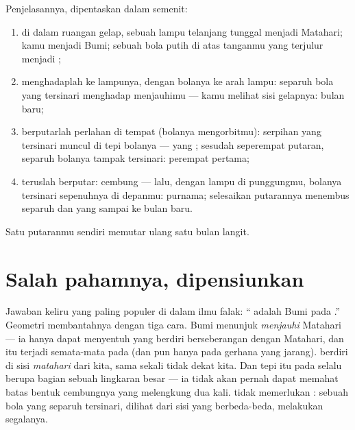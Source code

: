 \begin{method}\label{met:g7:moon-phases:walk}
Penjelasannya, dipentaskan dalam semenit:
\begin{enumerate}
  \item di dalam ruangan gelap, sebuah lampu telanjang tunggal
        menjadi Matahari; kamu menjadi Bumi; sebuah bola putih di
        atas tanganmu yang terjulur menjadi ;
  \item menghadaplah ke lampunya, dengan bolanya ke arah lampu:
        separuh bola yang tersinari menghadap menjauhimu --- kamu
        melihat sisi gelapnya: bulan baru;
  \item berputarlah perlahan di tempat (bolanya mengorbitmu):
        serpihan yang tersinari muncul di tepi bolanya ---  yang
        ; sesudah seperempat putaran, separuh bolanya tampak
        tersinari: perempat pertama;
  \item teruslah berputar: cembung --- lalu, dengan lampu di
        punggungmu, bolanya tersinari sepenuhnya di depanmu: purnama;
        selesaikan putarannya menembus separuh dan  yang
         sampai ke bulan baru.
\end{enumerate}
Satu putaranmu sendiri memutar ulang satu bulan langit.
\end{method}

\section{Salah pahamnya, dipensiunkan}

\begin{proposition}\label{prop:g7:moon-phases:notshadow}
Jawaban keliru yang paling populer di dalam ilmu falak: ``
adalah  Bumi pada .'' Geometri membantahnya dengan
tiga cara.  Bumi menunjuk \emph{menjauhi} Matahari ---
ia hanya dapat menyentuh  yang berdiri berseberangan dengan
Matahari, dan itu terjadi semata-mata pada  (dan pun
hanya pada gerhana yang jarang).   berdiri di sisi
\emph{matahari} dari kita, sama sekali tidak dekat  kita.
Dan tepi  itu pada  selalu berupa bagian sebuah
lingkaran besar --- ia tidak akan pernah dapat memahat batas bentuk
cembungnya yang melengkung dua kali.  tidak memerlukan
: sebuah bola yang separuh tersinari, dilihat dari sisi
yang berbeda-beda, melakukan segalanya.
\end{proposition}


